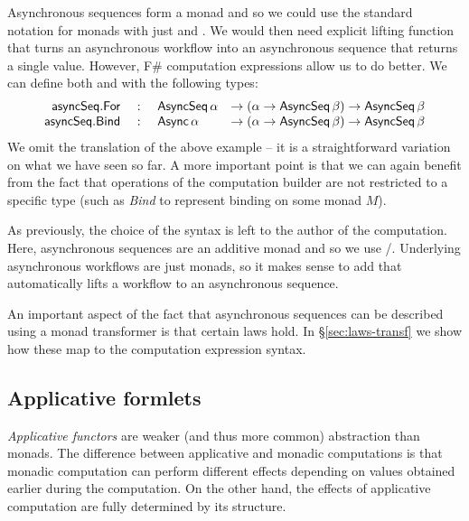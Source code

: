 \documentclass[runningheads,a4paper]{llncs}
\begin{document}
Asynchronous sequences form a monad and so we could use the standard notation for monads with
just  and . We would then need explicit lifting function that turns
an asynchronous workflow into an asynchronous sequence that returns a single value. However,
F\# computation expressions allow us to do better. We can define both  and 
 with the following types:
%
\begin{equation*}
\begin{array}{rcll}
\textnormal{\sffamily asyncSeq}.\textnormal{\sffamily For} &~:~& \textnormal{\sffamily AsyncSeq}\,\alpha &
   \rightarrow (\alpha \rightarrow \textnormal{\sffamily AsyncSeq}\,\beta) \rightarrow \textnormal{\sffamily AsyncSeq}\,\beta\\
\textnormal{\sffamily asyncSeq}.\textnormal{\sffamily Bind} &~:~& \textnormal{\sffamily Async}\,\alpha   &
   \rightarrow (\alpha \rightarrow \textnormal{\sffamily AsyncSeq}\,\beta) \rightarrow \textnormal{\sffamily AsyncSeq}\,\beta\\
\end{array}
\end{equation*}
%
We omit the translation of the above example -- it is a straightforward variation on what we have 
seen so far. A more important point is that we can again benefit from the fact that operations
of the computation builder are not restricted to a specific type (such as \emph{Bind} to represent
binding on some monad $M$).

As previously, the choice of the syntax is left to the author of the computation. Here, asynchronous
sequences are an additive monad and so we use /. Underlying
asynchronous workflows are just monads, so it makes sense to add  that automatically
lifts a workflow to an asynchronous sequence.

An important aspect of the fact that asynchronous sequences can be described using a monad
transformer is that certain laws hold. In \S\ref{sec:laws-transf} we show how these map to the 
computation expression syntax.


\subsection{Applicative formlets}
\label{sec:intro-formlets}

\emph{Applicative functors} \cite{applicative,idioms-obliv} are weaker (and thus more common) 
abstraction than monads. The difference between applicative and monadic computations is that 
monadic computation can perform different effects depending on values obtained earlier during the 
computation. On the other hand, the effects of applicative computation are fully determined 
by its structure. 
\end{document}
